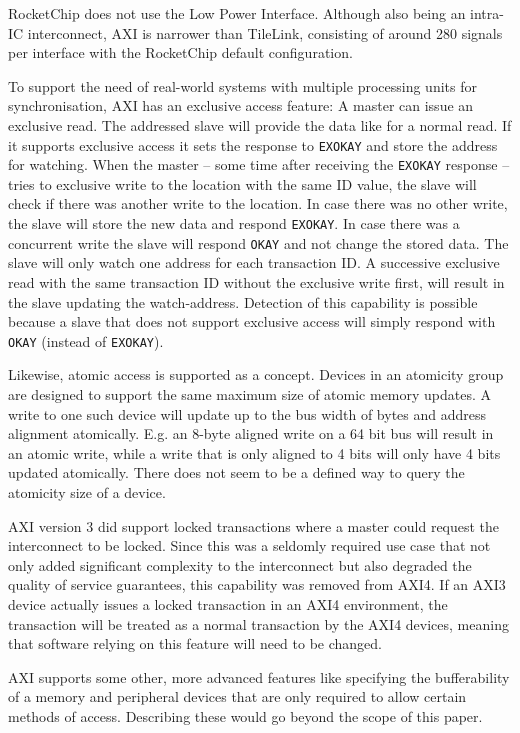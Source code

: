 \documentclass[journal,a4paper]{IEEEtran}
\begin{document}
RocketChip does not use the Low Power Interface.
Although also being an intra-IC interconnect, AXI is narrower than TileLink, consisting of around 280 signals per interface with the RocketChip default configuration.

To support the need of real-world systems with multiple processing units for synchronisation, AXI has an exclusive access feature: A master can issue an exclusive read.
The addressed slave will provide the data like for a normal read.
If it supports exclusive access it sets the response to \texttt{EXOKAY} and store the address for watching.
When the master -- some time after receiving the \texttt{EXOKAY} response -- tries to exclusive write to the location with the same ID value, the slave will check if there was another write to the location.
In case there was no other write, the slave will store the new data and respond \texttt{EXOKAY}. In case there was a concurrent write the slave will respond \texttt{OKAY} and not change the stored data. The slave will only watch one address for each transaction ID. A successive exclusive read with the same transaction ID without the exclusive write first, will result in the slave updating the watch-address.
Detection of this capability is possible because a slave that does not support exclusive access will simply respond with \texttt{OKAY} (instead of \texttt{EXOKAY}).

Likewise, atomic access is supported as a concept.
Devices in an atomicity group are designed to support the same maximum size of atomic memory updates.
A write to one such device will update up to the bus width of bytes and address alignment atomically.
E.g. an 8-byte aligned write on a 64 bit bus will result in an atomic write, while a write that is only aligned to 4 bits will only have 4 bits updated atomically. There does not seem to be a defined way to query the atomicity size of a device.

AXI version 3 did support locked transactions where a master could request the interconnect to be locked. Since this was a seldomly required use case that not only added significant complexity to the interconnect but also degraded the quality of service guarantees, this capability was removed from AXI4. If an AXI3 device actually issues a locked transaction in an AXI4 environment, the transaction will be treated as a normal transaction by the AXI4 devices, meaning that software relying on this feature will need to be changed.

AXI supports some other, more advanced features like specifying the bufferability of a memory and peripheral devices that are only required to allow certain methods of access. Describing these would go beyond the scope of this paper.
\end{document}
